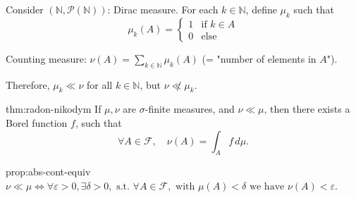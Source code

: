                 \begin{example}{}
                Consider $(\mathbb{N}, \mathcal{P}(\mathbb{N}))$: Dirac measure. For each $k \in \mathbb{N}$, define $\mu_k$ such that 
                \[
                \mu_k(A) = 
                \begin{cases} 
                1 & \text{if } k \in A \\
                0 & \text{else}
                \end{cases}
                \]
                
                Counting measure: $\nu(A) = \sum_{k \in \mathbb{N}} \mu_k(A)$ (= "number of elements in $A$").
                
                Therefore, $\mu_k \ll \nu$ for all $k \in \mathbb{N}$, but $\nu \not\ll \mu_k$.
                \end{example}
                \begin{theorem}{thm:radon-nikodym}
                    If $\mu, \nu$ are $\sigma$-finite measures, and $\nu \ll \mu$, then there exists a Borel function $f$, such that
                    $$\forall A \in \mathcal{F}, \quad \nu(A) = \int_A f \, d\mu.$$
                    \end{theorem}
                    
                    \begin{proposition}{prop:abs-cont-equiv}
                        $\nu \ll \mu \Leftrightarrow \forall \varepsilon > 0, \exists \delta > 0, \text{ s.t. } \forall A \in \mathcal{F}, \text{ with } \mu(A) < \delta \text{ we have } \nu(A) < \varepsilon$.
                        \end{proposition}
                        
